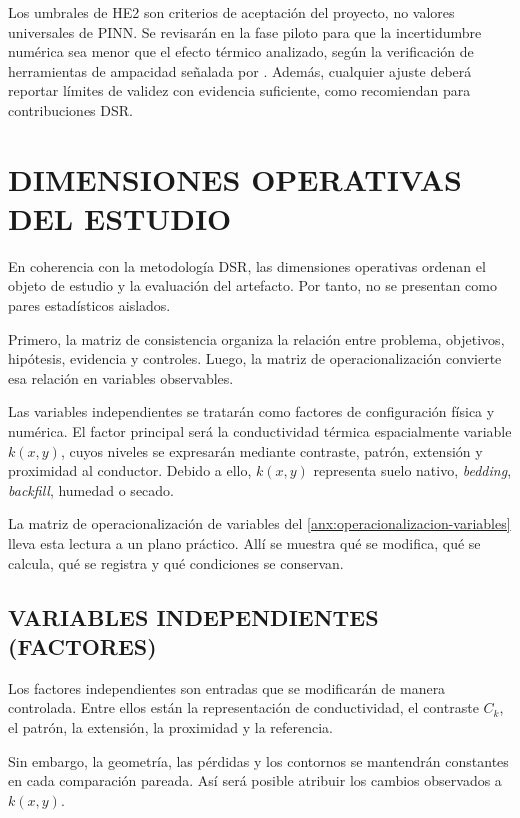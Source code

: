 \documentclass[11pt,a4paper,oneside]{report}
\newcommand{\kx}{k(x,y)}
\begin{document}
Los umbrales de HE2 son criterios de aceptación del proyecto, no valores universales de PINN. Se revisarán en la fase piloto para que la incertidumbre numérica sea menor que el efecto térmico analizado, según la verificación de herramientas de ampacidad señalada por \textcite[93--99]{cigre2025}. Además, cualquier ajuste deberá reportar límites de validez con evidencia suficiente, como recomiendan \textcite[350--351]{gregor2013} para contribuciones DSR.

\section{DIMENSIONES OPERATIVAS DEL ESTUDIO}
\label{sec:dimensiones-operativas}

En coherencia con la metodología DSR, las dimensiones operativas ordenan el objeto de estudio y la evaluación del artefacto. Por tanto, no se presentan como pares estadísticos aislados.

Primero, la matriz de consistencia organiza la relación entre problema, objetivos, hipótesis, evidencia y controles. Luego, la matriz de operacionalización convierte esa relación en variables observables.

Las variables independientes se tratarán como factores de configuración física y numérica. El factor principal será la conductividad térmica espacialmente variable $\kx$, cuyos niveles se expresarán mediante contraste, patrón, extensión y proximidad al conductor. Debido a ello, $\kx$ representa suelo nativo, \textit{bedding}, \textit{backfill}, humedad o secado.

La matriz de operacionalización de variables del \ref{anx:operacionalizacion-variables} lleva esta lectura a un plano práctico. Allí se muestra qué se modifica, qué se calcula, qué se registra y qué condiciones se conservan.

\subsection{VARIABLES INDEPENDIENTES (FACTORES)}

Los factores independientes son entradas que se modificarán de manera controlada. Entre ellos están la representación de conductividad, el contraste $C_k$, el patrón, la extensión, la proximidad y la referencia.

Sin embargo, la geometría, las pérdidas y los contornos se mantendrán constantes en cada comparación pareada. Así será posible atribuir los cambios observados a $\kx$.
\end{document}
